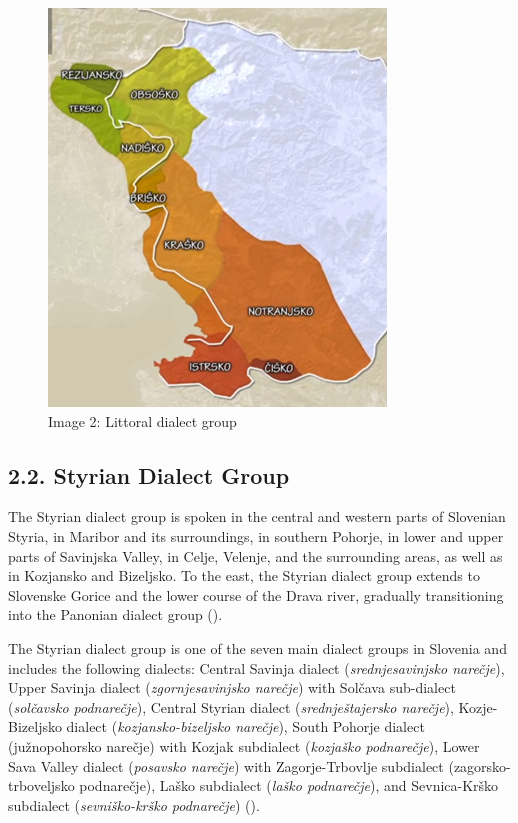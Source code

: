 \documentclass[fleqn,moreauthors,10pt]{ds_report}
\begin{document}
\begin{figure}
    \centering
    \includegraphics[width=0.5\linewidth]{Littoral.png}
    \caption{Image 2: Littoral dialect group
}
    \label{fig:map}
\end{figure}

\subsection{2.2. Styrian Dialect Group}

    The Styrian dialect group is spoken in the central and western parts of Slovenian Styria, in Maribor and its surroundings, in southern Pohorje, in lower and upper parts of Savinjska Valley, in Celje, Velenje, and the surrounding areas, as well as in Kozjansko and Bizeljsko. To the east, the Styrian dialect group extends to Slovenske Gorice and the lower course of the Drava river, gradually transitioning into the Panonian dialect group (\cite{Wikipedia 2023}).

    The Styrian dialect group is one of the seven main dialect groups in Slovenia and includes the following dialects: Central Savinja dialect (\textit{srednjesavinjsko narečje}), Upper Savinja dialect (\textit{zgornjesavinjsko narečje}) with Solčava sub-dialect (\textit{solčavsko podnarečje}), Central Styrian dialect (\textit{srednještajersko narečje}), Kozje-Bizeljsko dialect (\textit{kozjansko-bizeljsko narečje}), South Pohorje dialect (južnopohorsko narečje) with Kozjak subdialect (\textit{kozjaško podnarečje}), Lower Sava Valley dialect (\textit{posavsko narečje}) with Zagorje-Trbovlje subdialect (zagorsko-trboveljsko podnarečje), Laško subdialect (\textit{laško podnarečje}), and Sevnica-Krško subdialect (\textit{sevniško-krško podnarečje}) (\cite{Novljan 2017}). 
    
\end{document}
